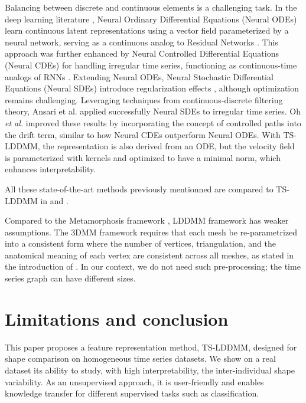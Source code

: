 Balancing between discrete and continuous elements is a challenging task. In the deep learning literature \cite{chen2018neural, kidger2020neural, tzen2019neural, jia2019neural, liu2019neural, ansari2023neural}, Neural Ordinary Differential Equations (Neural ODEs) \cite{chen2018neural} learn continuous latent representations using a vector field parameterized by a neural network, serving as a continuous analog to Residual Networks \cite{zagoruyko2016wide}. This approach was further enhanced by Neural Controlled Differential Equations (Neural CDEs) \cite{kidger2020neural} for handling irregular time series, functioning as continuous-time analogs of RNNs \cite{schuster1997bidirectional}. Extending Neural ODEs, Neural Stochastic Differential Equations (Neural SDEs) introduce regularization effects \cite{liu2019neural}, although optimization remains challenging. Leveraging techniques from continuous-discrete filtering theory, Ansari et al. \cite{ansari2023neural} applied successfully Neural SDEs to irregular time series. Oh \textit{et al.} \cite{oh2024stable} improved these results by incorporating the concept of controlled paths into the drift term, similar to how Neural CDEs outperform Neural ODEs. With TS-LDDMM, the representation is also derived from an ODE, but the velocity field is parameterized with kernels and optimized to have a minimal norm, which enhances interpretability.

All these state-of-the-art methods previously mentionned \cite{glaunes2008large,oh2024stable,wu2024shape,heo2024logistic} are compared to TS-LDDMM in  and .

Compared to the Metamorphosis framework \cite{blanz2003face}, LDDMM framework has weaker assumptions.
The 3DMM framework requires that each mesh be re-parametrized into a consistent form where the number of vertices, triangulation, and the anatomical meaning of each vertex are consistent across all meshes, as stated in the introduction of \cite{booth20163d}.
In our context, we do not need such pre-processing; the time series graph can have different sizes.
\vspace{-1ex}
\section{Limitations and conclusion}
\vspace{-1ex}
\label{sec:limitations}
  
This paper proposes a feature representation method, TS-LDDMM, designed for 
shape comparison on homogeneous time series datasets. We show on a real dataset 
its ability to study, with high interpretability, the inter-individual shape 
variability. As an unsupervised approach, it is user-friendly and enables knowledge 
transfer for different supervised tasks such as classification.

